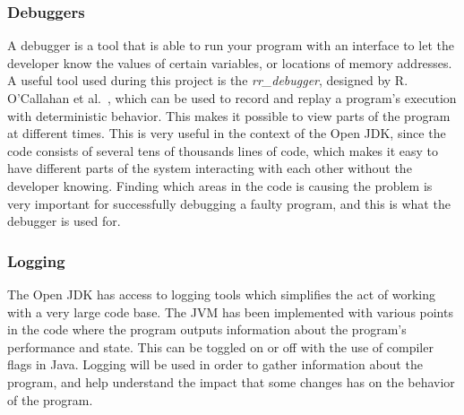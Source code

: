 \subsubsection{Debuggers}
A debugger is a tool that is able to run your program with an interface to let the developer know the values of certain variables, or locations of memory addresses. A useful tool used during this project is the \textit{rr\_debugger}, designed by R. O'Callahan et al.~\cite{rrdebugger}, which can be used to record and replay a program's execution with deterministic behavior. This makes it possible to view parts of the program at different times. This is very useful in the context of the Open JDK, since the code consists of several tens of thousands lines of code, which makes it easy to have different parts of the system interacting with each other without the developer knowing. Finding which areas in the code is causing the problem is very important for successfully debugging a faulty program, and this is what the debugger is used for.

\subsubsection{Logging}
The Open JDK has access to logging tools which simplifies the act of working with a very large code base. The JVM has been implemented with various points in the code where the program outputs information about the program's performance and state. This can be toggled on or off with the use of compiler flags in Java. Logging will be used in order to gather information about the program, and help understand the impact that some changes has on the behavior of the program.

